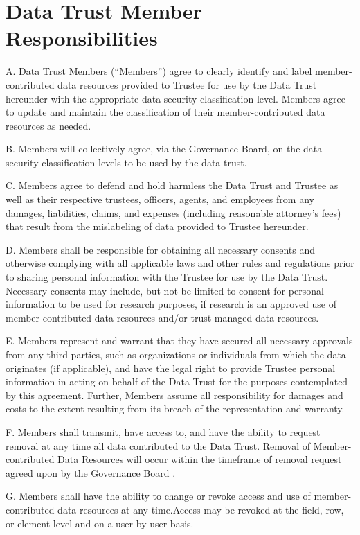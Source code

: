 \documentclass[]{book}
\begin{document}
\hypertarget{data-trust-member-responsibilities}{%
\chapter{Data Trust Member Responsibilities}\label{data-trust-member-responsibilities}}

A. Data Trust Members (``Members'') agree to clearly identify and label member-contributed data resources provided to Trustee for use by the Data Trust hereunder with the appropriate data security classification level. Members agree to update and maintain the classification of their member-contributed data resources as needed.

B. Members will collectively agree, via the Governance Board, on the data security classification levels to be used by the data trust.

C. Members agree to defend and hold harmless the Data Trust and Trustee as well as their respective trustees, officers, agents, and employees from any damages, liabilities, claims, and expenses (including reasonable attorney's fees) that result from the mislabeling of data provided to Trustee hereunder.

D. Members shall be responsible for obtaining all necessary consents and otherwise complying with all applicable laws and other rules and regulations prior to sharing personal information with the Trustee for use by the Data Trust. Necessary consents may include, but not be limited to consent for personal information to be used for research purposes, if research is an approved use of member-contributed data resources and/or trust-managed data resources.

E. Members represent and warrant that they have secured all necessary approvals from any third parties, such as organizations or individuals from which the data originates (if applicable), and have the legal right to provide Trustee personal information in acting on behalf of the Data Trust for the purposes contemplated by this agreement. Further, Members assume all responsibility for damages and costs to the extent resulting from its breach of the representation and warranty.

F. Members shall transmit, have access to, and have the ability to request removal at any time all data contributed to the Data Trust. Removal of Member-contributed Data Resources will occur within the timeframe of removal request agreed upon by the Governance Board .

G. Members shall have the ability to change or revoke access and use of member-contributed data resources at any time.Access may be revoked at the field, row, or element level and on a user-by-user basis.
\end{document}

